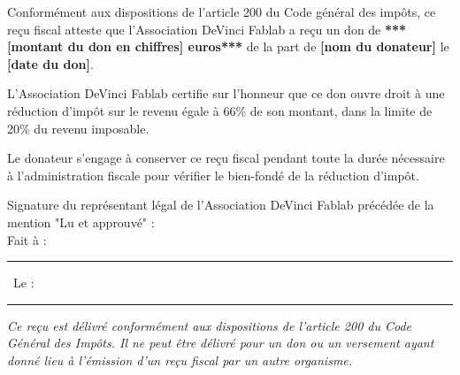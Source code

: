 \documentclass[11pt,a4paper]{article}
\begin{document}
\vspace{2cm}

Conformément aux dispositions de l'article 200 du Code général des impôts, ce reçu fiscal atteste que l'Association DeVinci Fablab a reçu un don de \textbf{***[montant du don en chiffres] euros***} de la part de \textbf{[nom du donateur]} le \textbf{[date du don]}.

\vspace{1cm}

L'Association DeVinci Fablab certifie sur l'honneur que ce don ouvre droit à une réduction d'impôt sur le revenu égale à 66\% de son montant, dans la limite de 20\% du revenu imposable.

\vspace{1cm}

Le donateur s'engage à conserver ce reçu fiscal pendant toute la durée nécessaire à l'administration fiscale pour vérifier le bien-fondé de la réduction d'impôt.

\vspace{\fill}
\begin{flushright}
    \begin{minipage}[t]{0.5\textwidth}
        \begin{framed}
            Signature du représentant légal de l'Association DeVinci Fablab précédée de la mention "Lu et approuvé" :
            \vspace{2.5cm} \\
            Fait à : \rule{3cm}{0.75pt} \
            Le : \rule{3cm}{0.75pt}
        \end{framed}
    \end{minipage}
\end{flushright}

\vspace{0.5cm}
\textit{\footnotesize Ce reçu est délivré conformément aux dispositions de l'article 200 du Code Général des Impôts. Il ne peut être délivré pour un don ou un versement ayant donné lieu à l'émission d'un reçu fiscal par un autre organisme.}
\end{document}
